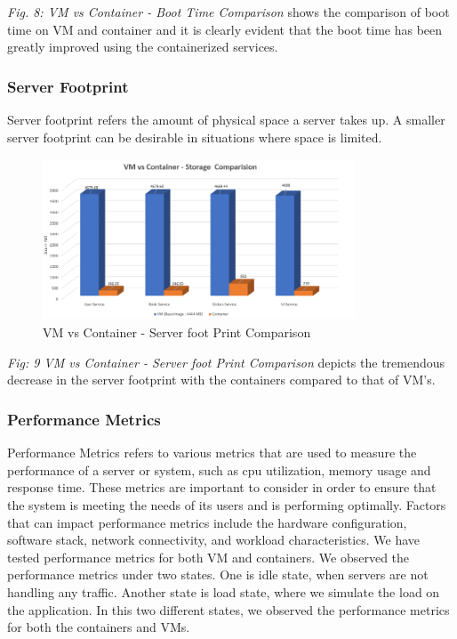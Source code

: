  \emph{Fig. 8: VM vs Container - Boot Time Comparison} shows the comparison of boot time on VM and container and it is clearly evident that the boot time has been greatly improved using the containerized services.

\subsubsection{Server Footprint}
Server footprint refers the amount of physical space a server takes up. A smaller server footprint can be desirable in situations where space is limited. 

\begin{figure}[!h]
    \centering
    \includegraphics[width=9.3cm, height=4.8cm]{images/footcomp.png}
    \caption{VM vs Container - Server foot Print Comparison}
\end{figure}

\emph{Fig: 9 VM vs Container - Server foot Print Comparison} depicts the tremendous decrease in the server footprint with the containers compared to that of VM's.


\subsubsection{Performance Metrics}
Performance Metrics refers to various metrics that are used to measure the performance of a server or system, such as cpu utilization, memory usage  and response time. These metrics are important to consider in order to ensure that the system is meeting the needs of its users and is performing optimally. Factors that can impact performance metrics include the hardware configuration, software stack, network connectivity, and workload characteristics. We have tested performance metrics for both VM and containers. We observed the performance metrics under two states. One is idle state, when servers are not handling any traffic. Another state is load state, where we simulate the load on the application. In this two different states, we observed the performance metrics for both the containers and VMs.

